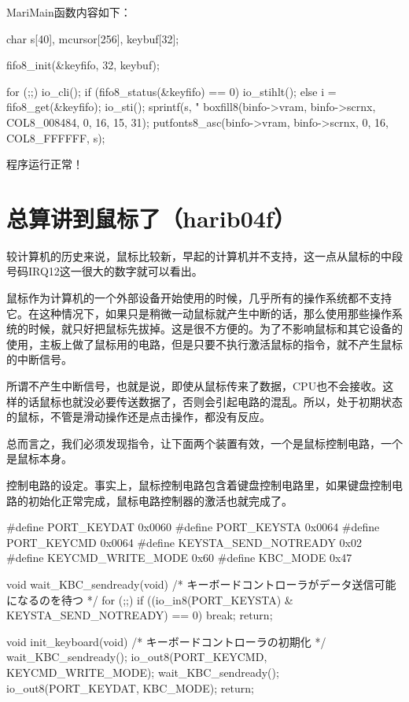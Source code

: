 MariMain函数内容如下：
\begin{code}
	char s[40], mcursor[256], keybuf[32];

	fifo8_init(&keyfifo, 32, keybuf);

	for (;;) {
		io_cli();
		if (fifo8_status(&keyfifo) == 0) {
			io_stihlt();
		} else {
			i = fifo8_get(&keyfifo);
			io_sti();
			sprintf(s, "%
			boxfill8(binfo->vram, binfo->scrnx, COL8_008484, 0, 16, 15, 31);
			putfonts8_asc(binfo->vram, binfo->scrnx, 0, 16, COL8_FFFFFF, s);
		}
	}
\end{code}

程序运行正常！
\section{	总算讲到鼠标了（harib04f）	}
较计算机的历史来说，鼠标比较新，早起的计算机并不支持，这一点从鼠标的中段号码IRQ12这一很大的数字就可以看出。

鼠标作为计算机的一个外部设备开始使用的时候，几乎所有的操作系统都不支持它。在这种情况下，如果只是稍微一动鼠标就产生中断的话，那么使用那些操作系统的时候，就只好把鼠标先拔掉。这是很不方便的。为了不影响鼠标和其它设备的使用，主板上做了鼠标用的电路，但是只要不执行激活鼠标的指令，就不产生鼠标的中断信号。

所谓不产生中断信号，也就是说，即使从鼠标传来了数据，CPU也不会接收。这样的话鼠标也就没必要传送数据了，否则会引起电路的混乱。所以，处于初期状态的鼠标，不管是滑动操作还是点击操作，都没有反应。

总而言之，我们必须发现指令，让下面两个装置有效，一个是鼠标控制电路，一个是鼠标本身。

\cs

控制电路的设定。事实上，鼠标控制电路包含着键盘控制电路里，如果键盘控制电路的初始化正常完成，鼠标电路控制器的激活也就完成了。

\begin{code}
#define PORT_KEYDAT				0x0060
#define PORT_KEYSTA				0x0064
#define PORT_KEYCMD				0x0064
#define KEYSTA_SEND_NOTREADY	0x02
#define KEYCMD_WRITE_MODE		0x60
#define KBC_MODE				0x47

void wait_KBC_sendready(void)
{
	/* キーボードコントローラがデータ送信可能になるのを待つ */
	for (;;) {
		if ((io_in8(PORT_KEYSTA) & KEYSTA_SEND_NOTREADY) == 0) {
			break;
		}
	}
	return;
}

void init_keyboard(void)
{
	/* キーボードコントローラの初期化 */
	wait_KBC_sendready();
	io_out8(PORT_KEYCMD, KEYCMD_WRITE_MODE);
	wait_KBC_sendready();
	io_out8(PORT_KEYDAT, KBC_MODE);
	return;
}
\end{code}


